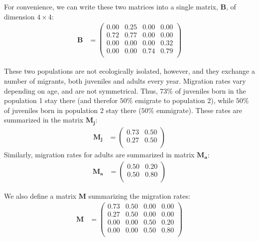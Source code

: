 \documentclass{article}\usepackage[]{graphicx}\usepackage[]{color}
\begin{document}
For convenience, we can write these two matrices into a single matrix, $\boldsymbol{B}$, of dimension $4\times 4$:
\begin{align*}\boldsymbol{B} &=%
\begin{pmatrix}{}
  0.00 & 0.25 & 0.00 & 0.00 \\ 
  0.72 & 0.77 & 0.00 & 0.00 \\ 
  0.00 & 0.00 & 0.00 & 0.32 \\ 
  0.00 & 0.00 & 0.74 & 0.79 \\ 
  \end{pmatrix}
\end{align*}

These two populations are not ecologically isolated, however, and they exchange a number of migrants, both juveniles and adults every year. 
Migration rates vary depending on age, and are not symmetrical. Thus, $73\%$ of juveniles born in the population 1 stay there (and therefor $50\%$ emigrate to population 2), while $50\%$ of juveniles born in population 2 stay there ($50\%$ emmigrate). 
These rates are summarized in the matrix $\boldsymbol{M_j}$:
\begin{align*}\boldsymbol{M_j} &=%
\begin{pmatrix}{}
  0.73 & 0.50 \\ 
  0.27 & 0.50 \\ 
  \end{pmatrix}
\end{align*}
Similarly, migration rates for adults are summarized in matrix $\boldsymbol{M_a}$:
\begin{align*}\boldsymbol{M_a} &=%
\begin{pmatrix}{}
  0.50 & 0.20 \\ 
  0.50 & 0.80 \\ 
  \end{pmatrix}
\end{align*}

We also define a matrix $\boldsymbol{M}$ summarizing the migration rates:
\begin{align*}\boldsymbol{M} &=%
\begin{pmatrix}{}
  0.73 & 0.50 & 0.00 & 0.00 \\ 
  0.27 & 0.50 & 0.00 & 0.00 \\ 
  0.00 & 0.00 & 0.50 & 0.20 \\ 
  0.00 & 0.00 & 0.50 & 0.80 \\ 
  \end{pmatrix}
\end{align*}
\end{document}
